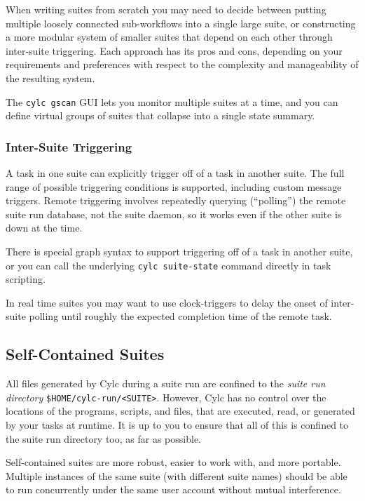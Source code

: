 When writing suites from scratch you may need to decide between putting
multiple loosely connected sub-workflows into a single large suite, or
constructing a more modular system of smaller suites that depend on each other
through inter-suite triggering. Each approach has its pros and cons, depending
on your requirements and preferences with respect to the complexity and
manageability of the resulting system.

The \lstinline=cylc gscan= GUI lets you monitor multiple suites at a time, and
you can define virtual groups of suites that collapse into a single state
summary.

\subsubsection{Inter-Suite Triggering}

A task in one suite can explicitly trigger off of a task in another suite. The
full range of possible triggering conditions is supported, including custom
message triggers. Remote triggering involves repeatedly querying (``polling'')
the remote suite run database, not the suite daemon, so it works even if the
other suite is down at the time.

There is special graph syntax to support triggering off of a task in another
suite, or you can call the underlying \lstinline=cylc suite-state= command
directly in task scripting.

In real time suites you may want to use clock-triggers to delay the onset of
inter-suite polling until roughly the expected completion time of the remote
task.

\subsection{Self-Contained Suites}
\label{Self-Contained Suites}

All files generated by Cylc during a suite run are confined to the {\em suite
run directory} \lstinline=$HOME/cylc-run/<SUITE>=. However, Cylc has no control
over the locations of the programs, scripts, and files, that are executed,
read, or generated by your tasks at runtime.  It is up to you to ensure that
all of this is confined to the suite run directory too, as far as possible.

Self-contained suites are more robust, easier to work with, and more portable.
Multiple instances of the same suite (with different suite names) should be
able to run concurrently under the same user account without mutual
interference.

